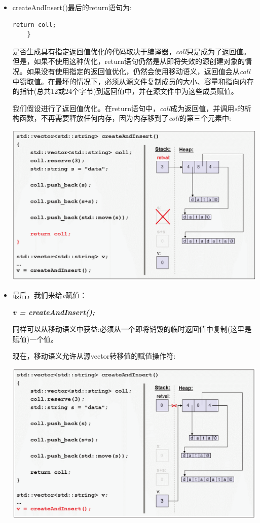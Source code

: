 \begin{itemize}
	\item createAndInsert()最后的return语句为:\par
	\begin{lstlisting}[caption={}]
		return coll;
	}
	\end{lstlisting}
	是否生成具有指定返回值优化的代码取决于编译器，\textit{coll}只是成为了返回值。但是，如果不使用这种优化，return语句仍然是从即将失效的源创建对象的情况。如果没有使用指定的返回值优化，仍然会使用移动语义，返回值会从\textit{coll}中窃取值。在最坏的情况下，必须从源文件复制成员的大小、容量和指向内存的指针(总共12或24个字节)到返回值中，并在源文件中为这些成员赋值。\par
	我们假设进行了返回值优化。在return语句中，\textit{coll}成为返回值，并调用\textit{s}的析构函数，不再需要释放任何内存，因为内存移到了\textit{coll}的第三个元素中:\par
	\begin{center}
		\includegraphics[width=1.0\textwidth]{content/1/chapter1/images/15}
	\end{center}
	\item 最后，我们来给\textit{v}赋值：\par
	\textit{\textbf{v = createAndInsert();}}\par
	同样可以从移动语义中获益:必须从一个即将销毁的临时返回值中复制(这里是赋值)一个值。\par
	现在，移动语义允许从源vector转移值的赋值操作符:\par
	\begin{center}
		\includegraphics[width=1.0\textwidth]{content/1/chapter1/images/16}

\end{center}
\end{itemize}
